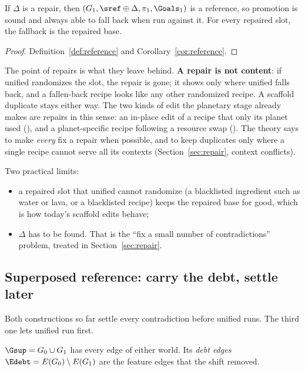 \begin{theorem}\label{thm:repaired}
If $\Delta$ is a repair, then $(G_1,\sref\oplus\Delta,\pi_1,\Goals_1)$ is a reference, so promotion is sound and always able to fall back when run against it. For every repaired slot, the fallback is the repaired base.
\end{theorem}
\begin{proof}
Definition~\ref{def:reference} and Corollary~\ref{cor:reference}.
\end{proof}

The point of repairs is what they leave behind. \textbf{A repair is not content}: if unified randomizes the slot, the repair is gone; it shows only where unified falls back, and a fallen-back recipe looks like any other randomized recipe. A scaffold duplicate stays either way. The two kinds of edit the planetary stage already makes are repairs in this sense: an in-place edit of a recipe that only its planet used (), and a planet-specific recipe following a resource swap (). The theory says to make \emph{every} fix a repair when possible, and to keep duplicates only where a single recipe cannot serve all its contexts (Section~\ref{sec:repair}, context conflicts).

Two practical limits:
\begin{itemize}[nosep]
\item a repaired slot that unified cannot randomize (a blacklisted ingredient such as water or lava, or a blacklisted recipe) keeps the repaired base for good, which is how today's scaffold edits behave;
\item $\Delta$ has to be found. That is the ``fix a small number of contradictions'' problem, treated in Section~\ref{sec:repair}.
\end{itemize}

\subsection{Superposed reference: carry the debt, settle later}

Both constructions so far settle every contradiction before unified runs. The third one lets unified run first.

\begin{definition}[Superposition]
$\Gsup=G_0\cup G_1$ has every edge of either world. Its \emph{debt edges} $\Edebt=E(G_0)\setminus E(G_1)$ are the feature edges that the shift removed.
\end{definition}


